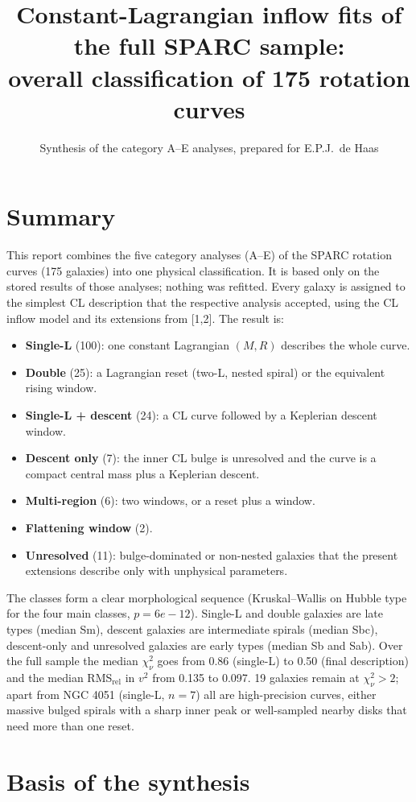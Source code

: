\documentclass[10pt]{article}
\title{\bfseries Constant-Lagrangian inflow fits of the full SPARC sample:\\ overall classification of 175 rotation curves}
\author{Synthesis of the category A--E analyses, prepared for E.P.J.\ de Haas}\date{}
\begin{document}
\maketitle
\section*{Summary}
This report combines the five category analyses (A--E) of the SPARC rotation curves (175 galaxies) into one physical classification. It is based only on the stored results of those analyses; nothing was refitted. Every galaxy is assigned to the simplest CL description that the respective analysis accepted, using the CL inflow model and its extensions from [1,2]. The result is:
\begin{itemize}\itemsep0pt
\item \textbf{Single-L} (100): one constant Lagrangian $(M,R)$ describes the whole curve.
\item \textbf{Double} (25): a Lagrangian reset (two-L, nested spiral) or the equivalent rising window.
\item \textbf{Single-L + descent} (24): a CL curve followed by a Keplerian descent window.
\item \textbf{Descent only} (7): the inner CL bulge is unresolved and the curve is a compact central mass plus a Keplerian descent.
\item \textbf{Multi-region} (6): two windows, or a reset plus a window.
\item \textbf{Flattening window} (2).
\item \textbf{Unresolved} (11): bulge-dominated or non-nested galaxies that the present extensions describe only with unphysical parameters.
\end{itemize}
The classes form a clear morphological sequence (Kruskal--Wallis on Hubble type for the four main classes, $p=6e-12$). Single-L and double galaxies are late types (median Sm), descent galaxies are intermediate spirals (median Sbc), descent-only and unresolved galaxies are early types (median Sb and Sab). Over the full sample the median $\chi^2_\nu$ goes from 0.86 (single-L) to 0.50 (final description) and the median RMS$_\mathrm{rel}$ in $v^2$ from 0.135 to 0.097. 19 galaxies remain at $\chi^2_\nu>2$; apart from NGC 4051 (single-L, $n=7$) all are high-precision curves, either massive bulged spirals with a sharp inner peak or well-sampled nearby disks that need more than one reset.

\section{Basis of the synthesis}
\end{document}
